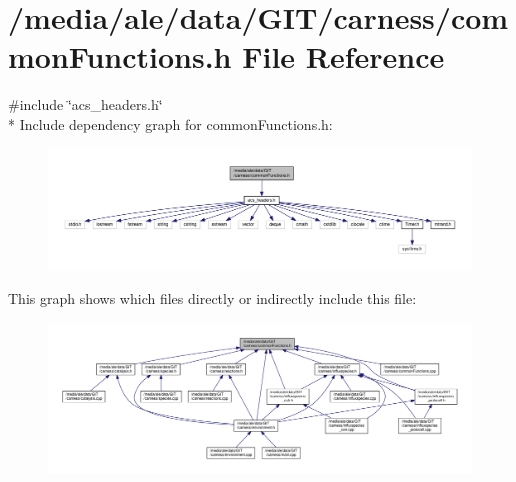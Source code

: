 \hypertarget{a00070}{\section{/media/ale/data/\-G\-I\-T/carness/common\-Functions.h File Reference}
\label{a00070}
}
{\ttfamily \#include \char`\"{}acs\-\_\-headers.\-h\char`\"{}}\\*
Include dependency graph for common\-Functions.\-h\-:\nopagebreak
\begin{figure}[H]
\begin{center}
\leavevmode
\includegraphics[width=350pt]{a00137}
\end{center}
\end{figure}
This graph shows which files directly or indirectly include this file\-:\nopagebreak
\begin{figure}[H]
\begin{center}
\leavevmode
\includegraphics[width=350pt]{a00138}
\end{center}
\end{figure}
